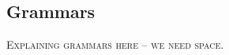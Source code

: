 \documentclass[conference]{IEEEtran}
\begin{document}


\subsection{Grammars}
\textsc{Explaining grammars here -- we need space.}
\end{document}
